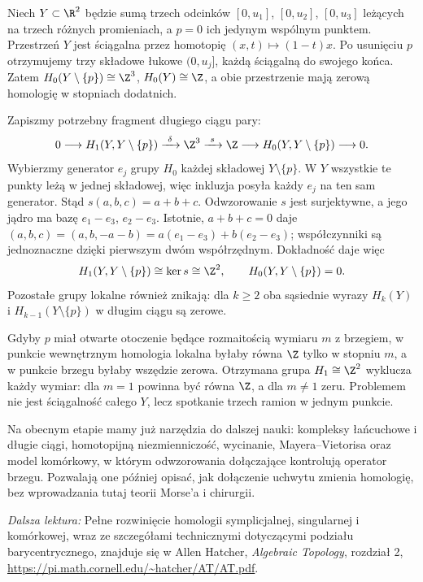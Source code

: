 \begin{przyklad}
\label{prz:lokalna-homologia-trojnog-8}
Niech $Y\subset\R^2$ będzie sumą trzech odcinków
$[0,u_1]$, $[0,u_2]$, $[0,u_3]$ leżących na trzech różnych
promieniach, a $p=0$ ich jedynym wspólnym punktem.
Przestrzeń $Y$ jest ściągalna przez homotopię
$(x,t)\mapsto(1-t)x$. Po usunięciu $p$ otrzymujemy trzy
składowe łukowe $(0,u_j]$, każdą ściągalną do swojego końca.
Zatem $H_0(Y\setminus\{p\})\cong\Z^3$, $H_0(Y)\cong\Z$,
a obie przestrzenie mają zerową homologię w stopniach dodatnich.

Zapiszmy potrzebny fragment długiego ciągu pary:
\[
 0\longrightarrow H_1(Y,Y\setminus\{p\})
 \xrightarrow{\ \delta\ }\Z^3
 \xrightarrow{\ s\ }\Z
 \longrightarrow H_0(Y,Y\setminus\{p\})
 \longrightarrow0.
\]
Wybierzmy generator $e_j$ grupy $H_0$ każdej składowej
$Y\setminus\{p\}$. W $Y$ wszystkie te punkty leżą w jednej
składowej, więc inkluzja posyła każdy $e_j$ na ten sam generator.
Stąd $s(a,b,c)=a+b+c$. Odwzorowanie $s$ jest surjektywne,
a jego jądro ma bazę $e_1-e_3$, $e_2-e_3$.
Istotnie, $a+b+c=0$ daje
$(a,b,c)=(a,b,-a-b)=a(e_1-e_3)+b(e_2-e_3)$;
współczynniki są jednoznaczne dzięki pierwszym dwóm współrzędnym.
Dokładność daje więc
\[
 H_1(Y,Y\setminus\{p\})\cong\ker s\cong\Z^2,
 \qquad H_0(Y,Y\setminus\{p\})=0.
\]
Pozostałe grupy lokalne również znikają: dla $k\geq2$
oba sąsiednie wyrazy $H_k(Y)$ i $H_{k-1}(Y\setminus\{p\})$
w długim ciągu są zerowe.

Gdyby $p$ miał otwarte otoczenie będące rozmaitością wymiaru $m$
z brzegiem, w punkcie wewnętrznym homologia lokalna byłaby równa
$\Z$ tylko w stopniu $m$, a w punkcie brzegu byłaby wszędzie zerowa.
Otrzymana grupa $H_1\cong\Z^2$ wyklucza każdy wymiar:
dla $m=1$ powinna być równa $\Z$, a dla $m\ne1$ zeru.
Problemem nie jest ściągalność
całego $Y$, lecz spotkanie trzech ramion w jednym punkcie.
\end{przyklad}



Na obecnym etapie mamy
już narzędzia do dalszej nauki:
kompleksy łańcuchowe i długie ciągi,
homotopijną niezmienniczość,
wycinanie, Mayera--Vietorisa
oraz model komórkowy, w którym
odwzorowania dołączające kontrolują
operator brzegu. Pozwalają one
później opisać, jak dołączenie
uchwytu zmienia homologię,
bez wprowadzania tutaj
teorii Morse'a i chirurgii.


\par\smallskip
{\footnotesize\noindent\emph{Dalsza lektura:}
Pełne rozwinięcie homologii symplicjalnej,
singularnej i komórkowej, wraz ze
szczegółami technicznymi dotyczącymi
podziału barycentrycznego, znajduje się
w Allen Hatcher,
\emph{Algebraic Topology}, rozdział 2,
\url{https://pi.math.cornell.edu/~hatcher/AT/AT.pdf}.\par}
\clearpage

